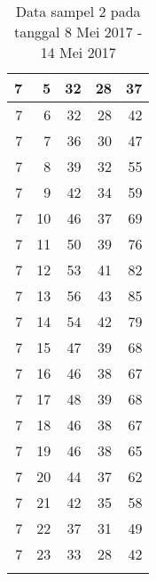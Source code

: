 \begin{longtable}{|r|r|r|r|r|}
    7     & 5     & 32    & 28    & 37 \\\hline
    7     & 6     & 32    & 28    & 42 \\\hline
    7     & 7     & 36    & 30    & 47 \\\hline
    7     & 8     & 39    & 32    & 55 \\\hline
    7     & 9     & 42    & 34    & 59 \\\hline
    7     & 10    & 46    & 37    & 69 \\\hline
    7     & 11    & 50    & 39    & 76 \\\hline
    7     & 12    & 53    & 41    & 82 \\\hline
    7     & 13    & 56    & 43    & 85 \\\hline
    7     & 14    & 54    & 42    & 79 \\\hline
    7     & 15    & 47    & 39    & 68 \\\hline
    7     & 16    & 46    & 38    & 67 \\\hline
    7     & 17    & 48    & 39    & 68 \\\hline
    7     & 18    & 46    & 38    & 67 \\\hline
    7     & 19    & 46    & 38    & 65 \\\hline
    7     & 20    & 44    & 37    & 62 \\\hline
    7     & 21    & 42    & 35    & 58 \\\hline
    7     & 22    & 37    & 31    & 49 \\\hline
    7     & 23    & 33    & 28    & 42 \\\hline
    
  \caption{Data sampel 2 pada tanggal 8 Mei 2017 - 14 Mei 2017}
  \label{tab:datasample28052017}%
\end{longtable}%